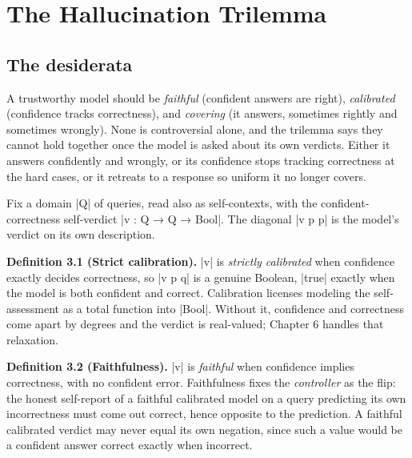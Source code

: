 \documentclass{memoir}
\begin{document}
\section{The Hallucination Trilemma}\label{Two--Schemas--of--Impossibility-005F-005F-005F--Machine--Checked--Limits--of--Trustworthy--Machine--Learning-005F-005F-005F--and--Why--They--Tighten--with--Capability----Three--Trilemmata-005F-005F-005F--One--Theorem----The--Hallucination--Trilemma}



\subsection{The desiderata}\label{Two--Schemas--of--Impossibility-005F-005F-005F--Machine--Checked--Limits--of--Trustworthy--Machine--Learning-005F-005F-005F--and--Why--They--Tighten--with--Capability----Three--Trilemmata-005F-005F-005F--One--Theorem----The--Hallucination--Trilemma----The--desiderata}

A trustworthy model should be \emph{faithful} (confident answers are right),
\emph{calibrated} (confidence tracks correctness), and \emph{covering} (it answers,
sometimes rightly and sometimes wrongly). None is controversial alone, and the
trilemma says they cannot hold together once the model is asked about its own
verdicts. Either it answers confidently and wrongly, or its confidence stops
tracking correctness at the hard cases, or it retreats to a response so uniform
it no longer covers.

Fix a domain \LeanVerb|Q| of queries, read also as self-contexts, with the
confident-correctness self-verdict \LeanVerb|v : Q → Q → Bool|. The diagonal \LeanVerb|v p p| is
the model's verdict on its own description.

\textbf{Definition 3.1 (Strict calibration).} \LeanVerb|v| is \emph{strictly calibrated} when confidence
exactly decides correctness, so \LeanVerb|v p q| is a genuine Boolean, \LeanVerb|true| exactly
when the model is both confident and correct. Calibration licenses modeling the
self-assessment as a total function into \LeanVerb|Bool|. Without it, confidence and
correctness come apart by degrees and the verdict is real-valued; Chapter 6
handles that relaxation.

\textbf{Definition 3.2 (Faithfulness).} \LeanVerb|v| is \emph{faithful} when confidence implies
correctness, with no confident error. Faithfulness fixes the \emph{controller} as the
flip: the honest self-report of a faithful calibrated model on a query
predicting its own incorrectness must come out correct, hence opposite to the
prediction. A faithful calibrated verdict may never equal its own negation,
since such a value would be a confident answer correct exactly when incorrect.
\end{document}
